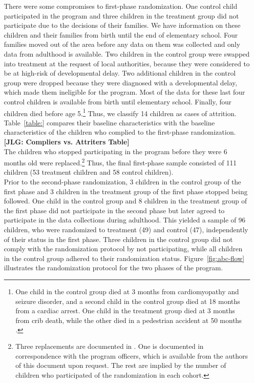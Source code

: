 \noindent There were some compromises to first-phase randomization. One control child participated in the program and three children in the treatment group did not participate due to the decisions of their families. We have information on these children and their families from birth until the end of elementary school. Four families moved out of the area before any data on them was collected and only data from adulthood is available. Two children in the control group were swapped into treatment at the request of local authorities, because they were considered to be at high-risk of developmental delay. Two additional children in the control group were dropped because they were diagnosed with a developmental delay, which made them ineligible for the program. Most of the data for these last four control children is available from birth until elementary school. Finally, four children died before age 5.\footnote{One child in the control group died at 3 months from cardiomyopathy and seizure disorder, and a second child in the control group died at 18 months from a cardiac arrest. One child in the treatment group died at 3 months from crib death, while the other died in a pedestrian accident at 50 months \citet{Ramey_Campbell_1984_AJMD}.} Thus, we classify 14 children as cases of attrition. Table~\ref{table:} compares their baseline characteristics with the baseline characteristics of the children who complied to the first-phase randomization.\\

\noindent \textbf{[JLG: Compliers vs. Attriters Table]}\\

\noindent The children who stopped participating in the program before they were 6 months old were replaced.\footnote{Three replacements are documented in \citet{Ramey_Campbell_1979_SR}. One is documented in correspondence with the program officers, which is available from the authors of this document upon request. The rest are implied by the number of children who participated of the randomization in each cohort.} Thus, the final first-phase sample consisted of 111 children (53 treatment children and 58 control children).\\

\noindent Prior to the second-phase randomization, 3 children in the control group of the first phase and 3 children in the treatment group of the first phase stopped being followed. One child in the control group and 8 children in the treatment group of the first phase did not participate in the second phase but later agreed to participate in the data collections during adulthood. This yielded a sample of 96 children, who were randomized to treatment (49) and control (47), independently of their status in the first phase. Three children in the control group did not comply with the randomization protocol by not participating, while all children in the control group adhered to their randomization status. Figure~\ref{fig:abc-flow} illustrates the randomization protocol for the two phases of the program.

